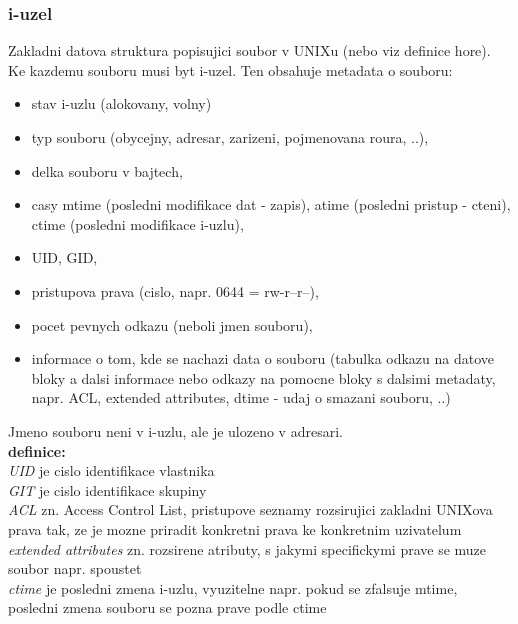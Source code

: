 \documentclass[a4paper, 11pt]{article}
\begin{document}
\subsubsection{i-uzel}
Zakladni datova struktura popisujici soubor v UNIXu (nebo viz definice hore). Ke kazdemu souboru musi byt i-uzel. Ten obsahuje metadata o souboru: 
\begin{itemize}
    \item stav i-uzlu (alokovany, volny)
    \item typ souboru (obycejny, adresar, zarizeni, pojmenovana roura, ..),
    \item delka souboru v bajtech,
    \item casy mtime (posledni modifikace dat - zapis), atime (posledni pristup - cteni), ctime (posledni modifikace i-uzlu),
    \item UID, GID,
    \item pristupova prava (cislo, napr. 0644 = rw-r--r--),
    \item pocet pevnych odkazu (neboli jmen souboru),
    \item informace o tom, kde se nachazi data o souboru (tabulka odkazu na datove bloky a dalsi informace nebo odkazy na pomocne bloky s dalsimi metadaty, napr. ACL, extended attributes, dtime - udaj o smazani souboru, ..) \\
\end{itemize}

Jmeno souboru neni v i-uzlu, ale je ulozeno v adresari. \\

\textbf{definice:} \\[0.5em]
\textit{UID} je cislo identifikace vlastnika \\[0.2em]
\textit{GIT} je cislo identifikace skupiny \\[0.2em]
\textit{ACL} zn. Access Control List, pristupove seznamy rozsirujici zakladni UNIXova prava tak, ze je mozne priradit konkretni prava ke konkretnim uzivatelum \\[0.2em]
\textit{extended attributes} zn. rozsirene atributy, s jakymi specifickymi prave se muze soubor napr. spoustet \\[0.2em]
\textit{ctime} je posledni zmena i-uzlu, vyuzitelne napr. pokud se zfalsuje mtime, posledni zmena souboru se pozna prave podle ctime \\
\end{document}
